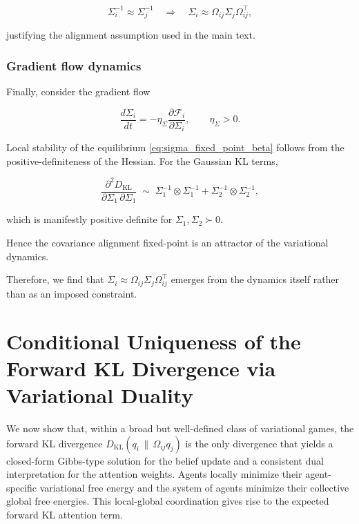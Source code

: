 \documentclass[twoside,11pt]{article}
\begin{document}
\begin{equation}
\Sigma_i^{-1} \approx \Sigma_j^{-1}
\quad\Longrightarrow\quad
\Sigma_i \approx \Omega_{ij}\Sigma_j\Omega_{ij}^\top,
\end{equation}

justifying the alignment assumption used in the main text.

\subsubsection{Gradient flow dynamics}

Finally, consider the gradient flow

\begin{equation}
\frac{d\Sigma_i}{dt}
=-\eta_\Sigma
\frac{\partial \mathcal{F}_i}{\partial \Sigma_i},
\qquad\eta_\Sigma > 0.
\end{equation}

Local stability of the equilibrium \eqref{eq:sigma_fixed_point_beta} follows from the positive-definiteness of the Hessian. For the Gaussian KL terms,

\begin{equation}
\frac{\partial^2 D_{\mathrm{KL}}}{\partial \Sigma_1 \, \partial \Sigma_1}
\;\sim\;
\Sigma_1^{-1} \otimes \Sigma_1^{-1}
+ \Sigma_2^{-1} \otimes \Sigma_2^{-1},
\end{equation}

which is manifestly positive definite for $\Sigma_1,\Sigma_2 \succ 0$.

Hence the covariance alignment fixed-point is an attractor of the variational dynamics.

Therefore, we find that $\Sigma_i \approx \Omega_{ij}\Sigma_j\Omega_{ij}^\top$ emerges from the dynamics itself rather than as an imposed constraint.
















\section{Conditional Uniqueness of the Forward KL Divergence via Variational Duality}

We now show that, within a broad but well-defined class of variational games, the forward KL divergence $D_{\mathrm{KL}}(q_i \,\|\, \Omega_{ij} q_j)$ is the only divergence that yields a closed-form Gibbs-type solution for the belief update and a consistent dual interpretation for the attention weights.  Agents locally minimize their agent-specific variational free energy and the system of agents minimize their collective global free energies.  This local-global coordination gives rise to the expected forward KL attention term.
\end{document}
